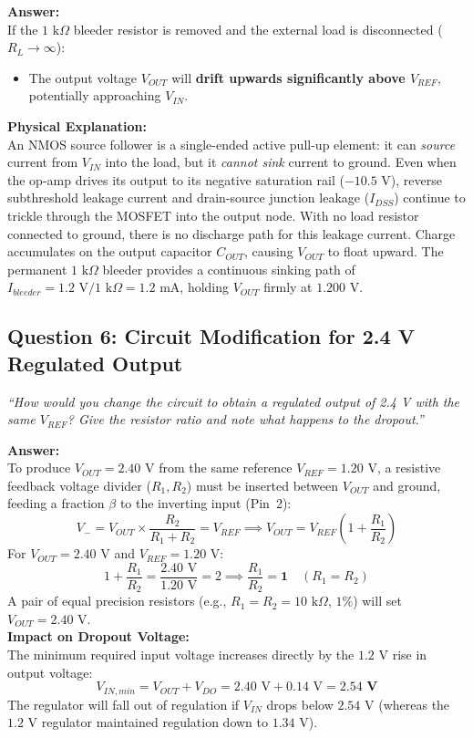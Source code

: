 \documentclass[11pt,a4paper]{article}
\begin{document}
\textbf{Answer:}\\
If the $1\text{ k}\Omega$ bleeder resistor is removed and the external load is disconnected ($R_L \to \infty$):
\begin{itemize}
    \item The output voltage $V_{OUT}$ will \textbf{drift upwards significantly above $V_{REF}$}, potentially approaching $V_{IN}$.
\end{itemize}
\textbf{Physical Explanation:}\\
An NMOS source follower is a single-ended active pull-up element: it can \emph{source} current from $V_{IN}$ into the load, but it \emph{cannot sink} current to ground. Even when the op-amp drives its output to its negative saturation rail ($-10.5\text{ V}$), reverse subthreshold leakage current and drain-source junction leakage ($I_{DSS}$) continue to trickle through the MOSFET into the output node. With no load resistor connected to ground, there is no discharge path for this leakage current. Charge accumulates on the output capacitor $C_{OUT}$, causing $V_{OUT}$ to float upward. The permanent $1\text{ k}\Omega$ bleeder provides a continuous sinking path of $I_{bleeder} = 1.2\text{ V} / 1\text{ k}\Omega = 1.2\text{ mA}$, holding $V_{OUT}$ firmly at $1.200\text{ V}$.

\subsection{Question 6: Circuit Modification for 2.4 V Regulated Output}
\textit{``How would you change the circuit to obtain a regulated output of 2.4 V with the same $V_{REF}$? Give the resistor ratio and note what happens to the dropout.''}

\textbf{Answer:}\\
To produce $V_{OUT} = 2.40\text{ V}$ from the same reference $V_{REF} = 1.20\text{ V}$, a resistive feedback voltage divider ($R_1, R_2$) must be inserted between $V_{OUT}$ and ground, feeding a fraction $\beta$ to the inverting input (Pin~2):
\begin{equation}
    V_- = V_{OUT} \times \frac{R_2}{R_1 + R_2} = V_{REF} \implies V_{OUT} = V_{REF} \left( 1 + \frac{R_1}{R_2} \right)
\end{equation}
For $V_{OUT} = 2.40\text{ V}$ and $V_{REF} = 1.20\text{ V}$:
\begin{equation}
    1 + \frac{R_1}{R_2} = \frac{2.40\text{ V}}{1.20\text{ V}} = 2 \implies \frac{R_1}{R_2} = \mathbf{1} \quad (R_1 = R_2)
\end{equation}
A pair of equal precision resistors (e.g., $R_1 = R_2 = 10\text{ k}\Omega$, $1\%$) will set $V_{OUT} = 2.40\text{ V}$.\\
\textbf{Impact on Dropout Voltage:}\\
The minimum required input voltage increases directly by the $1.2\text{ V}$ rise in output voltage:
\begin{equation}
    V_{IN,min} = V_{OUT} + V_{DO} = 2.40\text{ V} + 0.14\text{ V} = \mathbf{2.54\text{ V}}
\end{equation}
The regulator will fall out of regulation if $V_{IN}$ drops below $2.54\text{ V}$ (whereas the $1.2\text{ V}$ regulator maintained regulation down to $1.34\text{ V}$).
\end{document}
